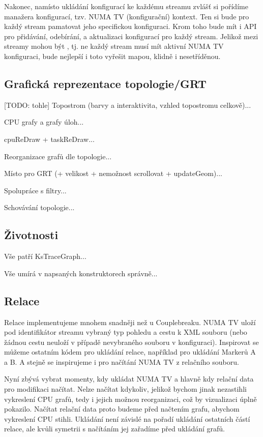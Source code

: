 Nakonec, namísto ukládání konfigurací ke každému streamu zvlášť si pořídíme manažera konfigurací, tzv. NUMA TV (konfigurační) kontext. Ten si bude pro každý stream pamatovat jeho specifickou konfiguraci. Krom toho bude mít i API pro přidávání, odebírání, a aktualizaci konfigurací pro každý stream. Jelikož mezi streamy mohou být , tj. ne každý stream musí mít aktivní NUMA TV konfiguraci, bude nejlepší i toto vyřešit mapou, klidně i nesetříděnou.

\subsection{Grafická reprezentace topologie/GRT}
\label{numatv-grt}
[TODO: tohle] %
Topostrom (barvy a interaktivita, vzhled topostromu celkově)...

CPU grafy a grafy úloh...

cpuReDraw + taskReDraw...

Reorganizace grafů dle topologie...

Místo pro GRT (+ velikost + nemožnost scrollovat + updateGeom)...

Spolupráce s filtry...

Schovávání topologie...

\subsection{Životnosti}
Vše patří KsTraceGraph...

Vše umírá v napsaných konstruktorech správně...

\subsection{Relace}
Relace implementujeme mnohem snadněji než u Couplebreaku. NUMA TV uloží pod identifikátor streamu vybraný typ pohledu a cestu k XML souboru (nebo žádnou cestu neuloží v případě nevybraného souboru v konfiguraci). Inspirovat se můžeme ostatním kódem pro ukládání relace, například pro ukládání Markerů A a B. A stejně se inspirujeme i pro načítání NUMA TV z relačního souboru.

Nyní zbývá vybrat momenty, kdy ukládat NUMA TV a hlavně kdy relační data pro modifikaci načítat. Nelze načítat kdykoliv, jelikož bychom jinak nezastihli vykreslení CPU grafů, tedy i jejich možnou reorganizaci, což by vizualizaci úplně pokazilo. Načítat relační data proto budeme před načtením grafu, abychom vykreslení CPU stihli. Ukládání není závislé na pořadí ukládání ostatních částí relace, ale kvůli symetrii s načítáním jej zařadíme před ukládání grafů.

